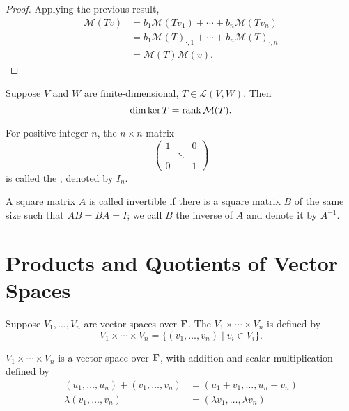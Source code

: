 \begin{proof}
Applying the previous result,
\begin{align*}
\mathcal{M}(Tv)&=b_1\mathcal{M}(Tv_1)+\cdots+b_n\mathcal{M}(Tv_n)\\
&=b_1\mathcal{M}(T)_{\cdot,1}+\cdots+b_n\mathcal{M}(T)_{\cdot,n}\\
&=\mathcal{M}(T)\mathcal{M}(v).
\end{align*}
\end{proof}

\begin{proposition}
Suppose $V$ and $W$ are finite-dimensional, $T\in\mathcal{L}(V,W)$. Then
\[\dim\ker T=\rank \mathcal{M}(T).\]
\end{proposition}

\begin{definition}
For positive integer $n$, the $n\times n$ matrix
\[\begin{pmatrix}
1&&0\\
&\ddots&\\
0&&1
\end{pmatrix}\]
is called the , denoted by $I_n$.
\end{definition}

\begin{definition}[Invertibility]
A square matrix $A$ is called invertible if there is a square matrix $B$ of the same size such that $AB=BA=I$; we call $B$ the inverse of $A$ and denote it by $A^{-1}$.
\end{definition}

\section{Products and Quotients of Vector Spaces}
\begin{definition}[Product]
Suppose $V_1,\dots,V_n$ are vector spaces over $\mathbf F$. The  $V_1\times\cdots\times V_n$ is defined by
\[V_1\times\cdots\times V_n=\{(v_1,\dots,v_n)\mid v_i\in V_i\}.\]
\end{definition}

\begin{proposition}
$V_1\times\cdots\times V_n$ is a vector space over $\mathbf F$, with addition and scalar multiplication defined by
\begin{align*}
(u_1,\dots,u_n)+(v_1,\dots,v_n)&=(u_1+v_1,\dots,u_n+v_n)\\
\lambda(v_1,\dots,v_n)&=(\lambda v_1,\dots,\lambda v_n)
\end{align*}
\end{proposition}

